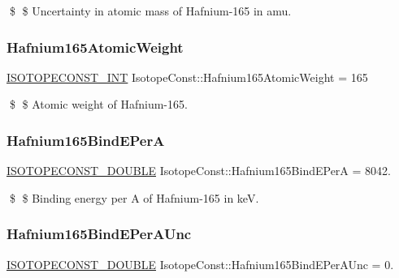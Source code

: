 \$ \$ Uncertainty in atomic mass of Hafnium-\/165 in amu. \mbox{\label{group___isotope_const-_hafnium-_hf165_gac2417189709799b5366c1b394173728a}} 
\subsubsection{\texorpdfstring{Hafnium165\+Atomic\+Weight}{Hafnium165AtomicWeight}}
{\footnotesize\ttfamily \mbox{\hyperlink{group___isotope_const-_macros_ga5f18360b3e99483a35c32d789e62621c}{I\+S\+O\+T\+O\+P\+E\+C\+O\+N\+S\+T\+\_\+\+I\+NT}} Isotope\+Const\+::\+Hafnium165\+Atomic\+Weight = 165}

\$ \$ Atomic weight of Hafnium-\/165. \mbox{\label{group___isotope_const-_hafnium-_hf165_ga0588839e6ad6fea851aee05b6c5ecead}} 
\subsubsection{\texorpdfstring{Hafnium165\+Bind\+E\+PerA}{Hafnium165BindEPerA}}
{\footnotesize\ttfamily \mbox{\hyperlink{group___isotope_const-_macros_ga8f45a7272ce02c0b4c65c44636ed719a}{I\+S\+O\+T\+O\+P\+E\+C\+O\+N\+S\+T\+\_\+\+D\+O\+U\+B\+LE}} Isotope\+Const\+::\+Hafnium165\+Bind\+E\+PerA = 8042.}

\$ \$ Binding energy per A of Hafnium-\/165 in keV. \mbox{\label{group___isotope_const-_hafnium-_hf165_ga4db11ce8ada2e3aca6aef6168e3ab289}} 
\subsubsection{\texorpdfstring{Hafnium165\+Bind\+E\+Per\+A\+Unc}{Hafnium165BindEPerAUnc}}
{\footnotesize\ttfamily \mbox{\hyperlink{group___isotope_const-_macros_ga8f45a7272ce02c0b4c65c44636ed719a}{I\+S\+O\+T\+O\+P\+E\+C\+O\+N\+S\+T\+\_\+\+D\+O\+U\+B\+LE}} Isotope\+Const\+::\+Hafnium165\+Bind\+E\+Per\+A\+Unc = 0.}

